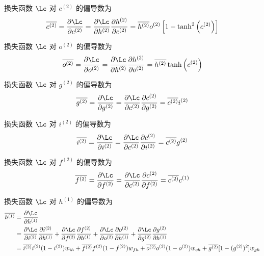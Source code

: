 \documentclass[openany]{ctexbook}
\theoremstyle{kaiti}
\theoremstyle{normal}
\begin{document}
损失函数 $\Lc$ 对 $c^{(2)}$ 的偏导数为
\begin{equation}
    \overline{c^{(2)}}
    =\frac{\partial\Lc}{\partial c^{(2)}}
    =\frac{\partial\Lc}{\partial h^{(2)}}\frac{\partial h^{(2)}}{\partial c^{(2)}}
    =\overline{h^{(2)}}o^{(2)}\left[1-\tanh^2\left(c^{(2)}\right)\right]
\end{equation}

损失函数 $\Lc$ 对 $o^{(2)}$ 的偏导数为
\begin{equation}
    \overline{o^{(2)}}
    =\frac{\partial\Lc}{\partial o^{(2)}}
    =\frac{\partial\Lc}{\partial h^{(2)}}\frac{\partial h^{(2)}}{\partial o^{(2)}}
    =\overline{h^{(2)}}\tanh\left(c^{(2)}\right)
\end{equation}

损失函数 $\Lc$ 对 $g^{(2)}$ 的偏导数为
\begin{equation}
    \overline{g^{(2)}}
    =\frac{\partial\Lc}{\partial g^{(2)}}
    =\frac{\partial\Lc}{\partial c^{(2)}}\frac{\partial c^{(2)}}{\partial g^{(2)}}
    =\overline{c^{(2)}}i^{(2)}
\end{equation}

损失函数 $\Lc$ 对 $i^{(2)}$ 的偏导数为
\begin{equation}
    \overline{i^{(2)}}
    =\frac{\partial\Lc}{\partial i^{(2)}}
    =\frac{\partial\Lc}{\partial c^{(2)}}\frac{\partial c^{(2)}}{\partial i^{(2)}}
    =\overline{c^{(2)}}g^{(2)}
\end{equation}

损失函数 $\Lc$ 对 $f^{(2)}$ 的偏导数为
\begin{equation}
    \overline{f^{(2)}}
    =\frac{\partial\Lc}{\partial f^{(2)}}
    =\frac{\partial\Lc}{\partial c^{(2)}}\frac{\partial c^{(2)}}{\partial f^{(2)}}
    =\overline{c^{(2)}}c^{(1)}
\end{equation}

损失函数 $\Lc$ 对 $h^{(1)}$ 的偏导数为
\begin{equation}
  \begin{aligned}
    \overline{h^{(1)}}
    &=\frac{\partial\Lc}{\partial h^{(1)}}\\
    &=\frac{\partial\Lc}{\partial i^{(2)}}\frac{\partial i^{(2)}}{\partial h^{(1)}}
      +\frac{\partial\Lc}{\partial f^{(2)}}\frac{\partial f^{(2)}}{\partial h^{(1)}}
      +\frac{\partial\Lc}{\partial o^{(2)}}\frac{\partial o^{(2)}}{\partial h^{(1)}}
      +\frac{\partial\Lc}{\partial g^{(2)}}\frac{\partial g^{(2)}}{\partial h^{(1)}}\\
    &=\overline{i^{(2)}}i^{(2)}(1-i^{(2)})w_{ih}+\overline{f^{(2)}}f^{(2)}(1-f^{(2)})w_{fh}+\overline{o^{(2)}}o^{(2)}(1-o^{(2)})w_{oh}+\overline{g^{(2)}}[1-(g^{(2)})^2]w_{gh}\\
  \end{aligned}
\end{equation}
\end{document}
